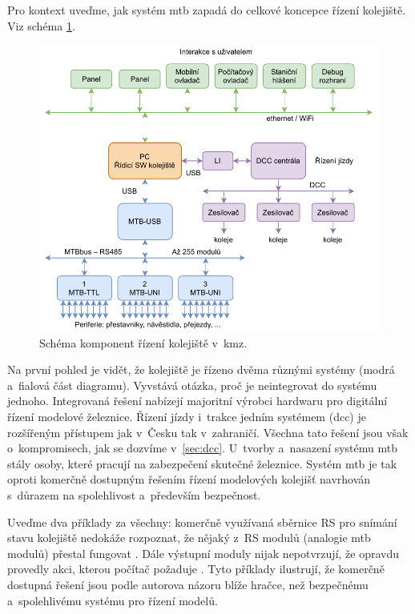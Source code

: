 Pro kontext uveďme, jak systém \gls{mtb} zapadá do celkové koncepce řízení
kolejiště. Viz schéma \ref{fig:control-topology}.

\begin{figure}[ht]
\includegraphics[width=\textwidth]{data/railroad-topology.pdf}
\caption{Schéma komponent řízení kolejiště v~\gls{kmz}.}
\label{fig:control-topology}
\end{figure}

Na první pohled je vidět, že kolejiště je řízeno dvěma různými systémy (modrá
a~fialová část diagramu).  Vyvstává otázka, proč je neintegrovat do systému
jednoho. Integrovaná řešení nabízejí majoritní výrobci hardwaru pro digitální
řízení modelové železnice.  Řízení jízdy i~trakce jedním systémem (\gls{dcc})
je rozšířeným přístupem jak v~Česku tak v~zahraničí. Všechna tato řešení jsou
však o~kompromisech, jak se dozvíme v~\ref{sec:dcc}. U~tvorby a~nasazení
systému \gls{mtb} stály osoby, které pracují na zabezpečení skutečné železnice.
Systém \gls{mtb} je tak oproti komerčně dostupným řešením řízení modelových
kolejišť navrhován s~důrazem na spolehlivost a~především bezpečnost.

Uveďme dva příklady za všechny: komerčně využívaná sběrnice RS pro snímání
stavu kolejiště nedokáže rozpoznat, že nějaký z~RS modulů (analogie \gls{mtb}
modulů) přestal fungovat \cite{rs:web}. Dále výstupní moduly nijak nepotvrzují,
že opravdu provedly akci, kterou počítač požaduje \cite{dcc_specs:web}. Tyto
příklady ilustrují, že komerčně dostupná řešení jsou podle autorova názoru blíže
hračce, než bezpečnému a~spolehlivému systému pro řízení modelů.

